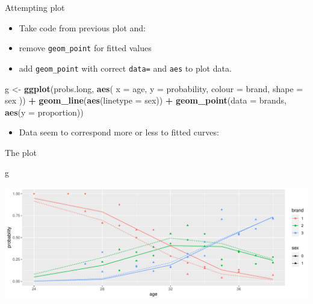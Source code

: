 \documentclass[
  ignorenonframetext,
]{beamer}
\newenvironment{Shaded}{\begin{snugshade}}{\end{snugshade}}
\newcommand{\DataTypeTok}[1]{\textcolor[rgb]{0.13,0.29,0.53}{#1}}
\newcommand{\KeywordTok}[1]{\textcolor[rgb]{0.13,0.29,0.53}{\textbf{#1}}}
\newcommand{\NormalTok}[1]{#1}
\newcommand{\OperatorTok}[1]{\textcolor[rgb]{0.81,0.36,0.00}{\textbf{#1}}}
\newcommand{\StringTok}[1]{\textcolor[rgb]{0.31,0.60,0.02}{#1}}
\providecommand{\tightlist}{%
  \setlength{\itemsep}{0pt}\setlength{\parskip}{0pt}}
\begin{document}
\begin{frame}[fragile]{Attempting plot}
\protect\hypertarget{attempting-plot}{}

\begin{itemize}
\item
  Take code from previous plot and:
\item
  remove \texttt{geom\_point} for fitted values
\item
  add \texttt{geom\_point} with correct \texttt{data=} and \texttt{aes}
  to plot data.
\end{itemize}

\begin{Shaded}
\begin{Highlighting}[]
\NormalTok{g <-}\StringTok{ }\KeywordTok{ggplot}\NormalTok{(probs.long, }\KeywordTok{aes}\NormalTok{(}
  \DataTypeTok{x =}\NormalTok{ age, }\DataTypeTok{y =}\NormalTok{ probability,}
  \DataTypeTok{colour =}\NormalTok{ brand, }\DataTypeTok{shape =}\NormalTok{ sex}
\NormalTok{)) }\OperatorTok{+}
\StringTok{  }\KeywordTok{geom_line}\NormalTok{(}\KeywordTok{aes}\NormalTok{(}\DataTypeTok{linetype =}\NormalTok{ sex)) }\OperatorTok{+}
\StringTok{  }\KeywordTok{geom_point}\NormalTok{(}\DataTypeTok{data =}\NormalTok{ brands, }\KeywordTok{aes}\NormalTok{(}\DataTypeTok{y =}\NormalTok{ proportion))}
\end{Highlighting}
\end{Shaded}

\begin{itemize}
\tightlist
\item
  Data seem to correspond more or less to fitted curves:
\end{itemize}

\end{frame}

\begin{frame}[fragile]{The plot}
\protect\hypertarget{the-plot-2}{}

\begin{Shaded}
\begin{Highlighting}[]
\NormalTok{g}
\end{Highlighting}
\end{Shaded}

\includegraphics{slides_d29_files/figure-beamer/unnamed-chunk-147-1.pdf}

\end{frame}
\end{document}
